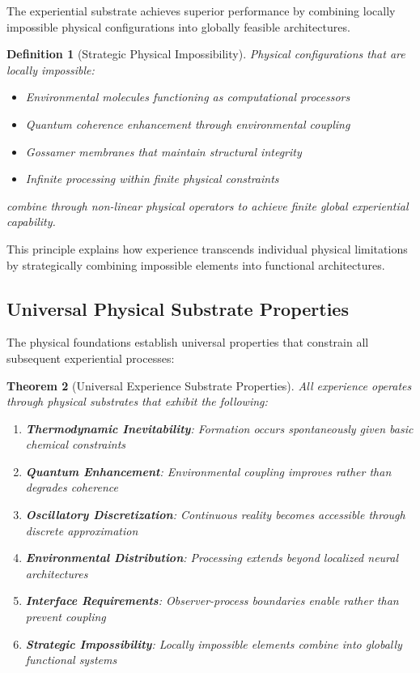 \documentclass{article}
\newtheorem{theorem}{Theorem}[section]
\newtheorem{definition}[theorem]{Definition}
\begin{document}
The experiential substrate achieves superior performance by combining locally impossible physical configurations into globally feasible architectures.

\begin{definition}[Strategic Physical Impossibility]
Physical configurations that are locally impossible:
\begin{itemize}
\item Environmental molecules functioning as computational processors
\item Quantum coherence enhancement through environmental coupling
\item Gossamer membranes that maintain structural integrity
\item Infinite processing within finite physical constraints
\end{itemize}
combine through non-linear physical operators to achieve finite global experiential capability.
\end{definition}

This principle explains how experience transcends individual physical limitations by strategically combining impossible elements into functional architectures.

\subsection{Universal Physical Substrate Properties}

The physical foundations establish universal properties that constrain all subsequent experiential processes:

\begin{theorem}[Universal Experience Substrate Properties]
All experience operates through physical substrates that exhibit the following:
\begin{enumerate}
\item \textbf{Thermodynamic Inevitability}: Formation occurs spontaneously given basic chemical constraints
\item \textbf{Quantum Enhancement}: Environmental coupling improves rather than degrades coherence
\item \textbf{Oscillatory Discretization}: Continuous reality becomes accessible through discrete approximation
\item \textbf{Environmental Distribution}: Processing extends beyond localized neural architectures
\item \textbf{Interface Requirements}: Observer-process boundaries enable rather than prevent coupling
\item \textbf{Strategic Impossibility}: Locally impossible elements combine into globally functional systems
\end{enumerate}
\end{theorem}
\end{document}
